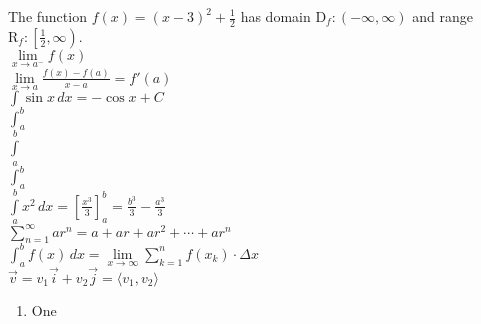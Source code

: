 \documentclass[11pt]{article}
\begin{document}
The function $f(x)=(x-3)^2+\frac{1}{2}$ has domain $\mathrm{D}_f:(-\infty,\infty)$ and range $\mathrm{R}_f:\left[\frac{1}{2},\infty\right)$.\\

$\lim \limits_{x \to a^-} f(x)$\\

$\displaystyle{\lim \limits_{x \to a} \frac{f(x)-f(a)}{x-a}=f'(a)}$\\

$\displaystyle{\int \sin x \,dx=-\cos x + C}$\\

$\int_a^b$\\

$\int \limits_a^b$\\

$\displaystyle{\int_a^b}$\\

$\displaystyle{\int \limits_{a}^{b}x^2 \,dx=\left[\frac{x^3}{3}\right]_{a}^{b}=\frac{b^3}{3}-\frac{a^3}{3}}$\\

$\displaystyle{\sum \limits_{n=1}^{\infty}ar^n=a+ar+ar^2+ \cdots +ar^n}$\\

$\displaystyle{\int_a^b f(x) \,dx=\lim \limits_{x \to \infty} \sum \limits_{k=1}^{n} f(x_k) \cdot \Delta x}$\\

$\vec{v}=v_1 \vec{i}+v_2 \vec{j}=\langle v_1, v_2 \rangle$

\begin{enumerate}[A]
\item One
\end{enumerate}
\end{document}
